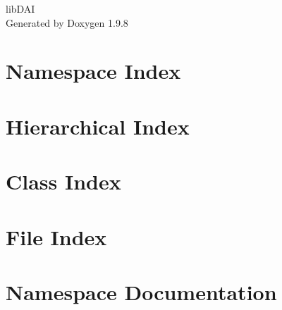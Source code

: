 \documentclass[twoside]{book}
\newcommand{\+}{\discretionary{\mbox{\scriptsize$\hookleftarrow$}}{}{}}
\newcommand{\clearemptydoublepage}{%
    \newpage{\pagestyle{empty}\cleardoublepage}%
  }
\begin{document}
  \raggedbottom
    \hypersetup{pageanchor=false,
                bookmarksnumbered=true,
                pdfencoding=unicode
               }
  \begin{titlepage}
  \vspace*{7cm}
  \begin{center}%
  {\Large lib\+DAI}\\
  \vspace*{1cm}
  {\large Generated by Doxygen 1.9.8}\\
  \end{center}
  \end{titlepage}
  \clearemptydoublepage
  \tableofcontents
  \clearemptydoublepage
  \hypersetup{pageanchor=true}














\chapter{Namespace Index}

\chapter{Hierarchical Index}

\chapter{Class Index}

\chapter{File Index}

\chapter{Namespace Documentation}

\end{document}
